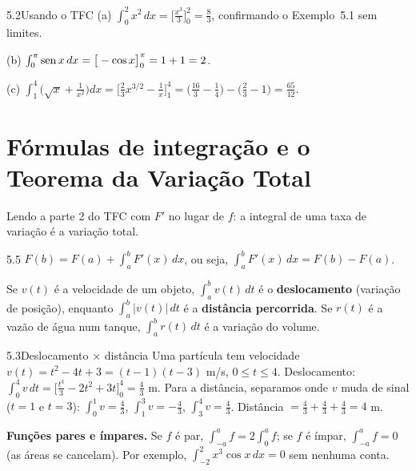 \begin{exemplo}{5.2}{Usando o TFC}
(a) $\int_0^2x^2\,dx=\Big[\frac{x^3}3\Big]_0^2=\frac83$, confirmando o Exemplo~5.1 sem limites.

(b) $\int_0^\pi\operatorname{sen} x\,dx=\big[-\cos x\big]_0^\pi=1+1=2$.

(c) $\displaystyle\int_1^4\Big(\sqrt x+\frac1{x^2}\Big)dx=\Big[\tfrac23x^{3/2}-\tfrac1x\Big]_1^4
=\Big(\tfrac{16}3-\tfrac14\Big)-\Big(\tfrac23-1\Big)=\tfrac{65}{12} .$
\end{exemplo}

\section{Fórmulas de integração e o Teorema da Variação Total}

Lendo a parte 2 do TFC com $F'$ no lugar de $f$: a integral de uma taxa de variação é a
variação total.

\begin{teorema}{5.5}
$F(b)=F(a)+\displaystyle\int_a^bF'(x)\,dx$, ou seja, $\displaystyle\int_a^bF'(x)\,dx=F(b)-F(a)$.
\end{teorema}

Se $v(t)$ é a velocidade de um objeto, $\int_a^bv(t)\,dt$ é o \textbf{deslocamento} (variação
de posição), enquanto $\int_a^b|v(t)|\,dt$ é a \textbf{distância percorrida}. Se $r(t)$ é a
vazão de água num tanque, $\int_a^br(t)\,dt$ é a variação do volume.

\begin{exemplo}{5.3}{Deslocamento \texorpdfstring{$\times$}{x} distância}
Uma partícula tem velocidade $v(t)=t^2-4t+3=(t-1)(t-3)$ m/s, $0\le t\le4$.
\solucao
Deslocamento: $\int_0^4v\,dt=\big[\frac{t^3}3-2t^2+3t\big]_0^4=\frac43$ m.
Para a distância, separamos onde $v$ muda de sinal ($t=1$ e $t=3$):
$\int_0^1v=\frac43$, $\int_1^3v=-\frac43$, $\int_3^4v=\frac43$. Distância
$=\frac43+\frac43+\frac43=4$ m.
\end{exemplo}

\textbf{Funções pares e ímpares.} Se $f$ é par, $\int_{-a}^af=2\int_0^af$; se $f$ é ímpar,
$\int_{-a}^af=0$ (as áreas se cancelam). Por exemplo, $\int_{-2}^2x^3\cos x\,dx=0$ sem nenhuma
conta.

